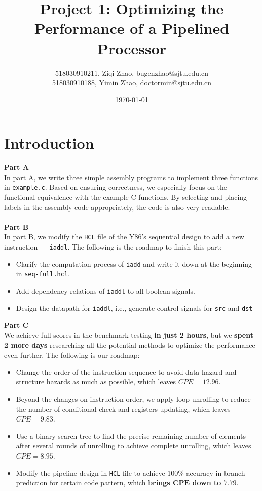 \documentclass[12pt,a4paper]{article}
\title{\textbf{Project 1: Optimizing the Performance of a Pipelined Processor}} %
\author{518030910211, Ziqi Zhao, bugenzhao@sjtu.edu.cn \\
        518030910188, Yimin Zhao, doctormin@sjtu.edu.cn \\ } %
\date{\today} %
\begin{document}
\maketitle %

\section{Introduction}
\textbf{Part A}
\\
In part A, we write three simple assembly programs to implement three functions in \texttt{example.c}. 
Based on ensuring correctness, we especially focus on the functional equivalence with the example C functions. 
By selecting and placing labels in the assembly code appropriately, the code is also very readable.\\ \\
\textbf{Part B}
\\
In part B, we modify the \texttt{HCL} file of the Y86's sequential design to add a new instruction --- \texttt{iaddl}. 
The following is the roadmap to finish this part:
\begin{itemize}
        \item Clarify the computation process of \texttt{iadd} and write it down at the beginning in \texttt{seq-full.hcl}.
        \item Add dependency relations of \texttt{iaddl} to all boolean signals.
        \item Design the datapath for \texttt{iaddl}, i.e., generate control signals for \texttt{src} and \texttt{dst}
\end{itemize}
\textbf{Part C}
\\
We achieve full scores in the benchmark testing \textbf{in just 2 hours}, 
but we \textbf{spent 2 more days} researching all the potential methods to optimize the performance even further. 
The following is our roadmap:
\begin{itemize}
        \item Change the order of the instruction sequence to avoid data hazard and structure hazards as much as possible, which leaves $CPE = 12.96$.
        \item Beyond the changes on instruction order, we apply loop unrolling to reduce the number of conditional check and registers updating, which leaves $CPE = 9.83$.
        \item Use a binary search tree to find the precise remaining number of elements after several rounds of unrolling to achieve complete unrolling, which leaves $CPE = 8.95$.
        \item Modify the pipeline design in \texttt{HCL} file to achieve 100\% accuracy in branch prediction for certain code pattern, which {\color{blue}\textbf{brings $\mathbf{CPE}$ down to $\mathbf{7.79}$}}.
\end{itemize}
\end{document}
